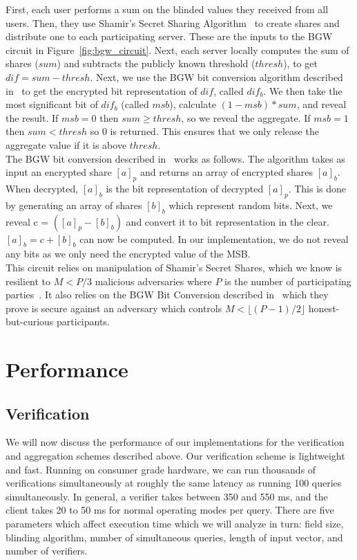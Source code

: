 \documentclass[conference]{IEEEtran}
\begin{document}
 First, each user performs a sum on the blinded values they received from all users. Then, they use Shamir's Secret Sharing Algorithm~\cite{Shamir:1979:SS:359168.359176} to create shares and distribute one to each participating server. These are the inputs to the BGW circuit in Figure~\ref{fig:bgw_circuit}. Next, each server locally computes the sum of shares ($sum$) and subtracts the publicly known threshold ($thresh$), to get $dif = sum - thresh$. Next, we use the BGW bit conversion algorithm described in~\cite{Damgard:2006:USC:2180286.2180307} to get the encrypted bit representation of $dif$, called $dif_b$. We then take the most significant bit of $dif_b$ (called $msb$), calculate $(1-msb)*sum$, and reveal the result. If $msb = 0$ then $sum \geq thresh$, so we reveal the aggregate. If $msb=1$ then $sum < thresh$ so 0 is returned. This ensures that we only release the aggregate value if it is above $thresh$.\\


The BGW bit conversion described in~\cite{Damgard:2006:USC:2180286.2180307} works as follows. The algorithm takes as input an encrypted share $[a]_p$ and returns an array of encrypted shares $[a]_b$. When decrypted, $[a]_b$ is the bit representation of decrypted $[a]_p$. This is done by generating an array of shares $[b]_b$ which represent random bits. Next, we reveal c = $([a]_p - [b]_b)$ and convert it to bit representation in the clear. $[a]_b = c + [b]_b$ can now be computed. In our implementation, we do not reveal any bits as we only need the encrypted value of the MSB.\\

This circuit relies on manipulation of Shamir's Secret Shares, which we know is resilient to $M < P/3$ malicious adversaries where $P$ is the number of participating parties~\cite{DBLP:journals/joc/AsharovL17}. It also relies on the BGW Bit Conversion described in~\cite{Damgard:2006:USC:2180286.2180307} which they prove is secure against an adversary which controls $M < \lfloor (P-1)/2 \rfloor$ honest-but-curious participants.\\






\section{Performance}
\subsection{Verification} \label{ssec:ver_perf}
We will now discuss the performance of our implementations for the verification and aggregation schemes described above. Our verification scheme is lightweight and fast. Running on consumer grade hardware, we can run thousands of verifications simultaneously at roughly the same latency as running 100 queries simultaneously. In general, a verifier takes between 350 and 550 ms, and the client takes 20 to 50 ms for normal operating modes per query. There are five parameters which affect execution time which we will analyze in turn: field size, blinding algorithm, number of simultaneous queries, length of input vector, and number of verifiers.\\
\end{document}
